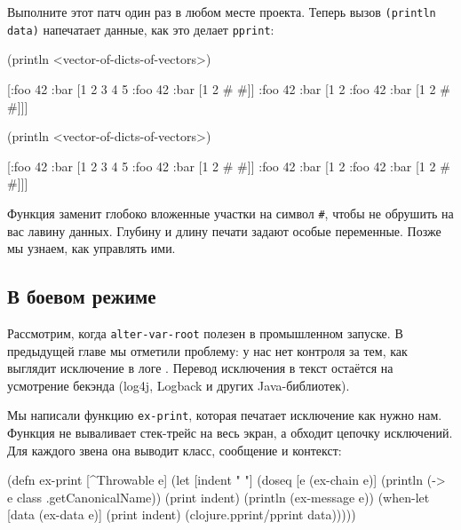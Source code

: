 Выполните этот патч один раз в любом месте проекта. Теперь вызов
\verb|(println data)| напечатает данные, как это делает \verb|pprint|:

\ifnarrow

\begin{english}
  \begin{clojure}
(println <vector-of-dicts-of-vectors>)

[{:foo 42
  :bar [1 2 3 4 5 {:foo 42
                   :bar [1 2 {# #}]}]}
 {:foo 42
  :bar [1 2 {:foo 42
             :bar [1 2 {# #}]}]}]
  \end{clojure}
\end{english}

\else

\begin{english}
  \begin{clojure}
(println <vector-of-dicts-of-vectors>)

[{:foo 42
  :bar [1 2 3 4 5 {:foo 42
                   :bar [1 2 {# #}]}]}
 {:foo 42
  :bar [1 2 {:foo 42
             :bar [1 2 {# #}]}]}]
  \end{clojure}
\end{english}

\fi

Функция заменит глобоко вложенные участки на символ \verb|#|, чтобы не обрушить
на вас лавину данных. Глубину и длину печати задают особые переменные. Позже мы
узнаем, как управлять ими.

\subsection{В боевом режиме}

\label{install-logger}


Рассмотрим, когда \verb|alter-var-root| полезен в промышленном запуске. В
предыдущей главе мы отметили проблему: у нас нет контроля за тем, как выглядит
исключение в логе . Перевод исключения в текст остаётся на
усмотрение бекэнда (log4j, Logback и других Java-библиотек).

Мы написали функцию \verb|ex-print|, которая печатает исключение как нужно
нам. Функция не вываливает стек-трейс на весь экран, а обходит цепочку
исключений. Для каждого звена она выводит класс, сообщение и контекст:

\ifnarrow

\begin{english}
  \begin{clojure}
(defn ex-print
  [^Throwable e]
  (let [indent "  "]
    (doseq [e (ex-chain e)]
      (println (-> e
                   class
                   .getCanonicalName))
      (print indent)
      (println (ex-message e))
      (when-let [data (ex-data e)]
        (print indent)
        (clojure.pprint/pprint data)))))
  \end{clojure}
\end{english}

